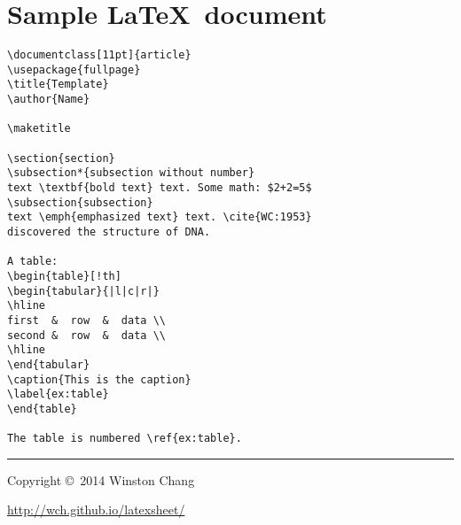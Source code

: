 \section{Sample \LaTeX\ document}
\begin{verbatim}
\documentclass[11pt]{article}
\usepackage{fullpage}
\title{Template}
\author{Name}

\maketitle

\section{section}
\subsection*{subsection without number}
text \textbf{bold text} text. Some math: $2+2=5$
\subsection{subsection}
text \emph{emphasized text} text. \cite{WC:1953}
discovered the structure of DNA.

A table:
\begin{table}[!th]
\begin{tabular}{|l|c|r|}
\hline
first  &  row  &  data \\
second &  row  &  data \\
\hline
\end{tabular}
\caption{This is the caption}
\label{ex:table}
\end{table}

The table is numbered \ref{ex:table}.

\end{verbatim}



\rule{0.3\linewidth}{0.25pt}
\scriptsize

Copyright \copyright\ 2014 Winston Chang

\href{http://wch.github.io/latexsheet/}{http://wch.github.io/latexsheet/}


